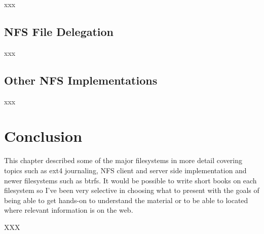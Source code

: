 xxx


\subsection{NFS File Delegation}

xxx


\subsection{Other NFS Implementations}

xxx




\section{Conclusion}

This chapter described some of the major filesystems in more detail covering topics such as ext4 journaling, NFS client and server side implementation and newer filesystems such as btrfs. It would be possible to write short books on each filesystem so I've been very selective in choosing what to present with the goals of being able to get hands-on to understand the material or to be able to located where relevant information is on the web.

XXX
